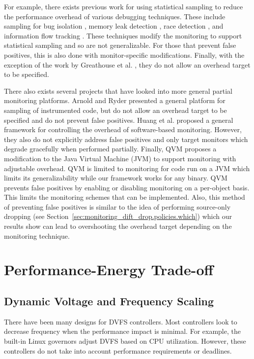 For example, there exists previous work for using statistical sampling to
reduce the performance overhead of various debugging techniques. These include
sampling for bug isolation \cite{liblit-pldi05}, memory leak detection
\cite{chilimbi-asplos04}, race detection \cite{literace-pldi09, pacer-pldi10},
and information flow tracking \cite{testudo-micro08, greathouse-cgo11}. These
techniques modify the monitoring to support statistical sampling and so are not
generalizable. For those that prevent false positives, this is also done with
monitor-specific modifications. Finally, with the exception of the work by
Greathouse et al. \cite{greathouse-cgo11}, they do not allow an overhead target
to be specified.

There also exists several projects that have looked into more general partial
monitoring platforms. Arnold and Ryder \cite{arnold-pldi01} presented a general
platform for sampling of instrumented code, but do not allow an overhead target
to be specified and do not prevent false positives. Huang et al.
\cite{huang-sttt12} proposed a general framework for controlling the overhead
of software-based monitoring. However, they also do not explicitly address
false positives and only target monitors which degrade gracefully when
performed partially. Finally, QVM \cite{qvm-oopsla08} proposes a modification
to the Java Virtual Machine (JVM) to support monitoring with adjustable
overhead. QVM is limited to monitoring for code run on a JVM which limits its
generalizability while our framework works for any binary. QVM prevents false
positives by enabling or disabling monitoring on a per-object basis. This
limits the monitoring schemes that can be implemented. Also, this method of
preventing false positives is similar to the idea of performing source-only
dropping (see Section~\ref{sec:monitoring_dift_drop.policies.which}) which our
results show can lead to overshooting the overhead target depending on the
monitoring technique. 

\section{Performance-Energy Trade-off}
\label{sec:related_work.energy}

\subsection{Dynamic Voltage and Frequency Scaling}

There have been many designs for DVFS controllers. Most controllers look to
decrease frequency when the performance impact is minimal. For example, the
built-in Linux governors \cite{linux_governors} adjust DVFS based on CPU
utilization.  However, these controllers do not take into account performance
requirements or deadlines.

